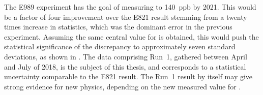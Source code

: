 The E989 experiment has the goal of measuring \amu to \SI{140}{ppb} by 2021. This would be a factor of four improvement over the E821 result stemming from a twenty times increase in statistics, which was the dominant error in the previous experiment. Assuming the same central value for \amu is obtained, this would push the statistical significance of the discrepancy to approximately seven standard deviations, as shown in . The data comprising Run~1, gathered between April and July of 2018, is the subject of this thesis, and corresponds to a statistical uncertainty comparable to the E821 result. The Run~1 result by itself may give strong evidence for new physics, depending on the new measured value for \amu.











